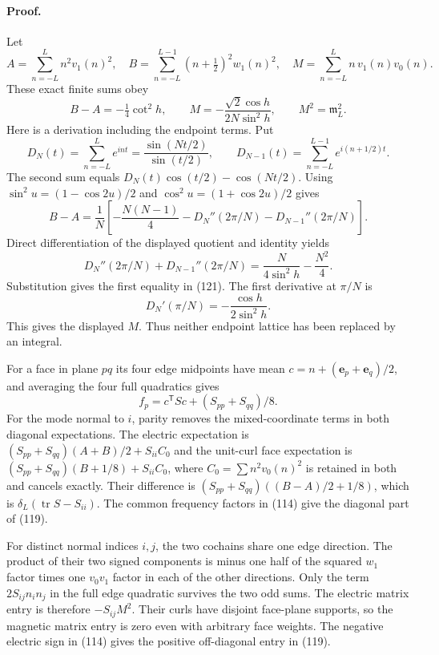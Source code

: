 \documentclass[11pt]{article}
\begin{document}
\paragraph{Proof.}
Let
\[
 A=\sum_{n=-L}^Ln^2v_1(n)^2,\quad
 B=\sum_{n=-L}^{L-1}(n+\tfrac12)^2w_1(n)^2,\quad
 M=\sum_{n=-L}^Ln\,v_1(n)v_0(n).
\]
These exact finite sums obey
\begin{equation}\label{eq:low-moments}
 B-A=-\tfrac14\cot^2h,\qquad
 M=-\frac{\sqrt2\cos h}{2N\sin^2h},\qquad M^2=\mathfrak m_L^2.
\end{equation}
Here is a derivation including the endpoint terms. Put
\[
 D_N(t)=\sum_{n=-L}^Le^{int}=\frac{\sin(Nt/2)}{\sin(t/2)},
 \qquad D_{N-1}(t)=\sum_{n=-L}^{L-1}e^{i(n+1/2)t}.
\]
The second sum equals
$D_N(t)\cos(t/2)-\cos(Nt/2)$.
Using $\sin^2u=(1-\cos2u)/2$ and $\cos^2u=(1+\cos2u)/2$ gives
\[
 B-A=\frac1N\left[
 -\frac{N(N-1)}4-D_N''(2\pi/N)-D_{N-1}''(2\pi/N)\right].
\]
Direct differentiation of the displayed quotient and identity yields
\[
 D_N''(2\pi/N)+D_{N-1}''(2\pi/N)
 =\frac{N}{4\sin^2h}-\frac{N^2}4.
\]
Substitution gives the first equality in (121).
The first derivative at $\pi/N$ is
\[
 D_N'(\pi/N)=-\frac{\cos h}{2\sin^2h}.
\]
This gives the displayed $M$.
Thus neither endpoint lattice has been replaced by an integral.

For a face in plane $pq$ its four edge midpoints have mean
$c=n+(\mathbf e_p+\mathbf e_q)/2$, and averaging the four full
quadratics gives
\[
 f_p=c^{\mathsf T}S c+(S_{pp}+S_{qq})/8 .
\]
For the mode normal to $i$, parity removes the mixed-coordinate terms
in both diagonal expectations. The electric expectation is
$(S_{pp}+S_{qq})(A+B)/2+S_{ii}C_0$ and the unit-curl face expectation
is $(S_{pp}+S_{qq})(B+1/8)+S_{ii}C_0$, where
$C_0=\sum n^2v_0(n)^2$ is retained in both and cancels exactly.
Their difference is
$(S_{pp}+S_{qq})((B-A)/2+1/8)$, which is
$\delta_L(\operatorname{tr}S-S_{ii})$.
The common frequency factors in (114) give the diagonal
part of (119).

For distinct normal indices $i,j$, the two cochains share one edge
direction. The product of their two signed components is minus one half
of the squared $w_1$ factor times one $v_0v_1$ factor in each of
the other directions. Only the term $2S_{ij}n_in_j$ in the full
edge quadratic survives the two odd sums. The electric matrix entry
is therefore $-S_{ij}M^2$. Their curls have disjoint face-plane
supports, so the magnetic matrix entry is zero even with arbitrary
face weights. The negative electric sign in (114)
gives the positive off-diagonal entry in (119).
\end{document}
